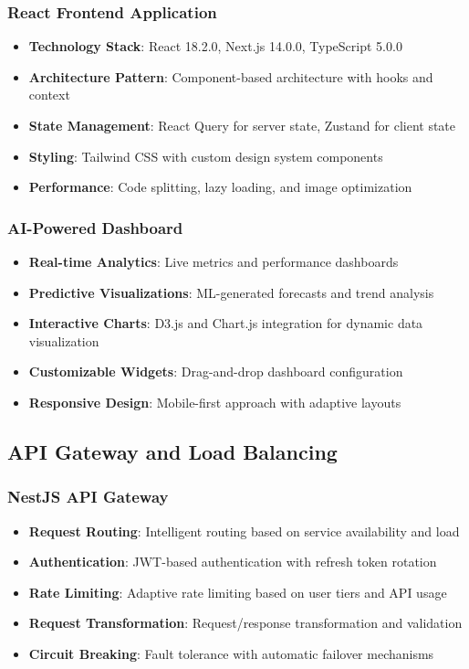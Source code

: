 \subsubsection{React Frontend Application}
\begin{itemize}
    \item \textbf{Technology Stack}: React 18.2.0, Next.js 14.0.0, TypeScript 5.0.0
    \item \textbf{Architecture Pattern}: Component-based architecture with hooks and context
    \item \textbf{State Management}: React Query for server state, Zustand for client state
    \item \textbf{Styling}: Tailwind CSS with custom design system components
    \item \textbf{Performance}: Code splitting, lazy loading, and image optimization
\end{itemize}

\subsubsection{AI-Powered Dashboard}
\begin{itemize}
    \item \textbf{Real-time Analytics}: Live metrics and performance dashboards
    \item \textbf{Predictive Visualizations}: ML-generated forecasts and trend analysis
    \item \textbf{Interactive Charts}: D3.js and Chart.js integration for dynamic data visualization
    \item \textbf{Customizable Widgets}: Drag-and-drop dashboard configuration
    \item \textbf{Responsive Design}: Mobile-first approach with adaptive layouts
\end{itemize}

\subsection{API Gateway and Load Balancing}

\subsubsection{NestJS API Gateway}
\begin{itemize}
    \item \textbf{Request Routing}: Intelligent routing based on service availability and load
    \item \textbf{Authentication}: JWT-based authentication with refresh token rotation
    \item \textbf{Rate Limiting}: Adaptive rate limiting based on user tiers and API usage
    \item \textbf{Request Transformation}: Request/response transformation and validation
    \item \textbf{Circuit Breaking}: Fault tolerance with automatic failover mechanisms
\end{itemize}


